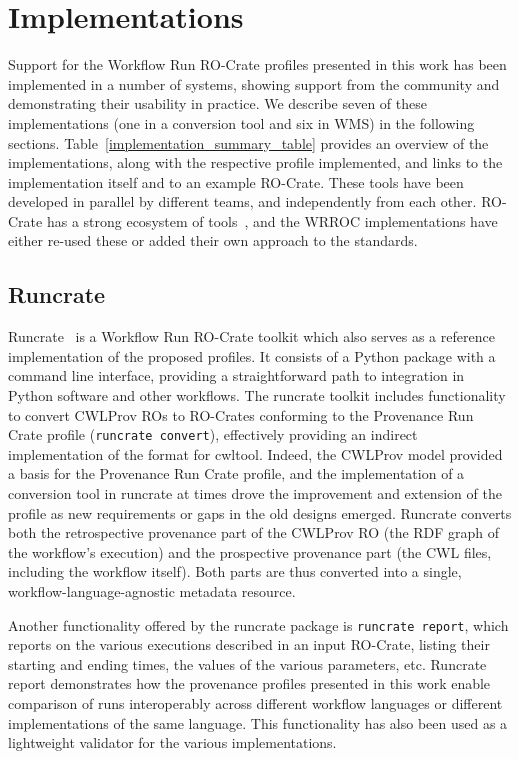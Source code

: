 \documentclass[10pt,letterpaper]{article}
\begin{document}
\section{Implementations}\label{implementations}

Support for the Workflow Run RO-Crate profiles presented in this work has been implemented in a number of systems, showing support from the community and demonstrating their usability in practice.
We describe seven of these implementations (one in a conversion tool and six in WMS) in the following sections.
Table~\ref{implementation_summary_table} provides an overview of the implementations, along with the respective profile implemented, and links to the implementation itself and to an example RO-Crate.
%
These tools have been developed in parallel by different teams, and independently from each other.
RO-Crate has a strong ecosystem of tools~\cite{Soiland-Reyes 2022a}, and the WRROC implementations have either re-used these or added their own approach to the standards.


\subsection{Runcrate}\label{runcrate}

Runcrate~\cite{runcrate} is a Workflow Run RO-Crate toolkit which also serves as a reference implementation of the proposed profiles.
It consists of a Python package with a command line interface, providing a straightforward path to integration in Python software and other workflows.
The runcrate toolkit includes functionality to convert CWLProv ROs to RO-Crates conforming to the Provenance Run Crate profile (\texttt{runcrate convert}), effectively providing an indirect implementation of the format for cwltool.
Indeed, the CWLProv model provided a basis for the Provenance Run Crate profile, and the implementation of a conversion tool in runcrate at times drove the improvement and extension of the profile as new requirements or gaps in the old designs emerged.
Runcrate converts both the retrospective provenance part of the CWLProv RO (the RDF graph of the workflow's execution) and the prospective provenance part (the CWL files, including the workflow itself).
Both parts are thus converted into a single, workflow-language-agnostic metadata resource.

Another functionality offered by the runcrate package is \texttt{runcrate report}, which reports on the various executions described in an input RO-Crate, listing their starting and ending times, the values of the various parameters, etc.
Runcrate report demonstrates how the provenance profiles presented in this work enable comparison of runs interoperably across different workflow languages or different implementations of the same language.
This functionality has also been used as a lightweight validator for the various implementations.
\end{document}
